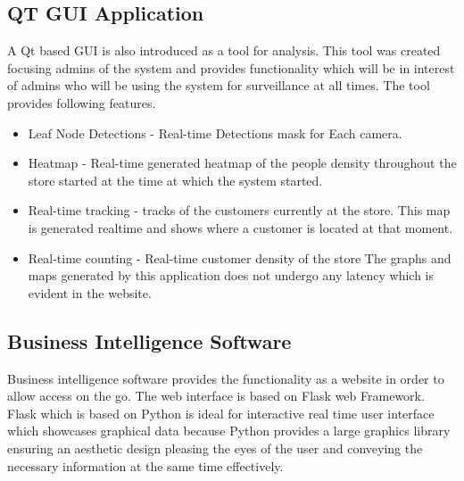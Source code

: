 \documentclass[12pt,a4paper]{report}
\begin{document}
\subsection{QT GUI Application}
A Qt based GUI is also introduced as a tool for analysis. This tool was created focusing admins of the system and provides functionality which will be in interest of admins who will be using the system for surveillance at all times. The tool provides following features.
\begin{itemize}
\item Leaf Node Detections - Real-time Detections mask for Each camera.
\item Heatmap - Real-time generated heatmap of the people density throughout the store started at the time at which the system started.
\item Real-time tracking - tracks of the customers currently at the store. This map is generated realtime and shows where a customer is located at that moment.
\item Real-time counting - Real-time customer density of the store
The graphs and maps generated by this application does not undergo any latency which is evident in the website.
\end{itemize}
\subsection{Business Intelligence Software}

Business intelligence software provides the functionality as a website in order to allow access on the go. The web interface is based on Flask web Framework. Flask which is based on Python is ideal for interactive real time user interface which showcases graphical data because Python provides a large graphics library ensuring an aesthetic design pleasing the eyes of the user and conveying the necessary information at the same time effectively.
\end{document}
